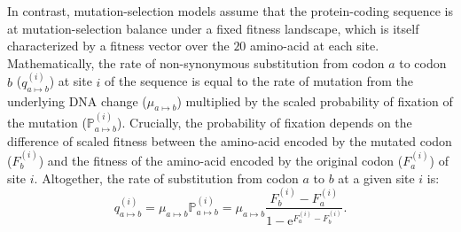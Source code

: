 \documentclass{article}
\newcommand{\e}{\mathrm{e}}
\newcommand{\proba}{\mathbb{P}}
\begin{document}
    In contrast, mutation-selection models assume that the protein-coding sequence is at mutation-selection balance under a fixed fitness landscape, which is itself characterized by a fitness vector over the $20$ amino-acid at each site\cite{yang_mutationselection_2008, halpern_evolutionary_1998, rodrigue_mechanistic_2010}.
    Mathematically, the rate of non-synonymous substitution from codon $a$ to codon $b$ ($q_{a \mapsto b}^{(i)}$) at site $i$ of the sequence is equal to the rate of mutation from the underlying DNA change ($\mu_{a \mapsto b}$) multiplied by the scaled probability of fixation of the mutation ($\proba_{a \mapsto b}^{(i)}$).
    Crucially, the probability of fixation depends on the difference of scaled fitness between the amino-acid encoded by the mutated codon ($F_b^{(i)}$) and the fitness of the amino-acid encoded by the original codon ($F_a^{(i)}$) of site $i$\cite{wright_evolution_1931, fisher_genetical_1930}.
    Altogether, the rate of substitution from codon $a$ to $b$ at a given site $i$ is:
    \begin{equation}
        q_{a \mapsto b}^{(i)} = \mu_{a \mapsto b} \proba_{a \mapsto b}^{(i)} = \mu_{a \mapsto b} \dfrac{F_b^{(i)} - F_a^{(i)}}{1 - \e^{F_a^{(i)} - F_b^{(i)}}}.
    \end{equation}
\end{document}
